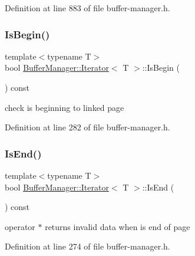 Definition at line 883 of file buffer-\/manager.\+h.

\mbox{\label{class_buffer_manager_1_1_iterator_a7ce4145bd6263f8003c4c4dee01a9c31}} 
\subsubsection{\texorpdfstring{IsBegin()}{IsBegin()}}
{\footnotesize\ttfamily template$<$typename T$>$ \\
bool \mbox{\hyperlink{class_buffer_manager_1_1_iterator}{Buffer\+Manager\+::\+Iterator}}$<$ T $>$\+::Is\+Begin (\begin{DoxyParamCaption}{ }\end{DoxyParamCaption}) const\hspace{0.3cm}{\ttfamily [inline]}}

check is beginning to linked page 

Definition at line 282 of file buffer-\/manager.\+h.

\mbox{\label{class_buffer_manager_1_1_iterator_a02a38a84fd54e45d06818d2807b172d8}} 
\subsubsection{\texorpdfstring{IsEnd()}{IsEnd()}}
{\footnotesize\ttfamily template$<$typename T$>$ \\
bool \mbox{\hyperlink{class_buffer_manager_1_1_iterator}{Buffer\+Manager\+::\+Iterator}}$<$ T $>$\+::Is\+End (\begin{DoxyParamCaption}{ }\end{DoxyParamCaption}) const\hspace{0.3cm}{\ttfamily [inline]}}

{\ttfamily operator $\ast$} returns invalid data when is end of page 

Definition at line 274 of file buffer-\/manager.\+h.

\mbox{\label{class_buffer_manager_1_1_iterator_a6afaceac9683f05d9e1ecfc9ff5f3a0f}} 
